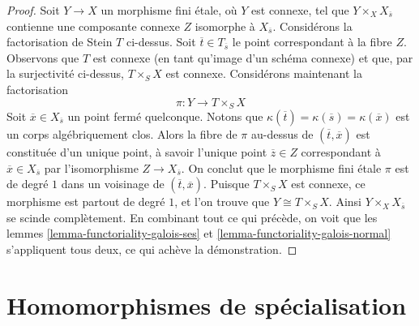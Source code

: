 \begin{proof}
\medskip\noindent
Soit $Y \to X$ un morphisme fini \'etale, où $Y$ est connexe, tel que
$Y \times_X X_{\overline{s}}$ contienne une composante connexe $Z$
isomorphe à $X_{\overline{s}}$. Considérons la factorisation de Stein $T$
ci-dessus. Soit $\overline{t} \in T_{\overline{s}}$ le point correspondant
à la fibre $Z$. Observons que $T$ est connexe (en tant qu'image d'un schéma
connexe) et que, par la surjectivité ci-dessus, $T \times_S X$ est connexe.
Considérons maintenant la factorisation
$$
\pi : Y \longrightarrow T \times_S X
$$
Soit $\overline{x} \in X_{\overline{s}}$ un point fermé quelconque. Notons que
$\kappa(\overline{t}) = \kappa(\overline{s}) = \kappa(\overline{x})$
est un corps algébriquement clos.
Alors la fibre de $\pi$ au-dessus de $(\overline{t}, \overline{x})$ est constituée
d'un unique point, à savoir l'unique point $\overline{z} \in Z$
correspondant à $\overline{x} \in X_{\overline{s}}$ par
l'isomorphisme $Z \to X_{\overline{s}}$. On conclut que le morphisme fini
\'etale $\pi$ est de degré $1$ dans un voisinage de
$(\overline{t}, \overline{x})$. Puisque $T \times_S X$ est connexe,
ce morphisme est partout de degré $1$, et l'on trouve que $Y \cong T \times_S X$.
Ainsi $Y \times_X X_{\overline{s}}$ se scinde complètement.
En combinant tout ce qui précède, on voit que les
lemmes \ref{lemma-functoriality-galois-ses} et
\ref{lemma-functoriality-galois-normal}
s'appliquent tous deux, ce qui achève la démonstration.
\end{proof}




\section{Homomorphismes de spécialisation}
\label{section-specialization-map}

